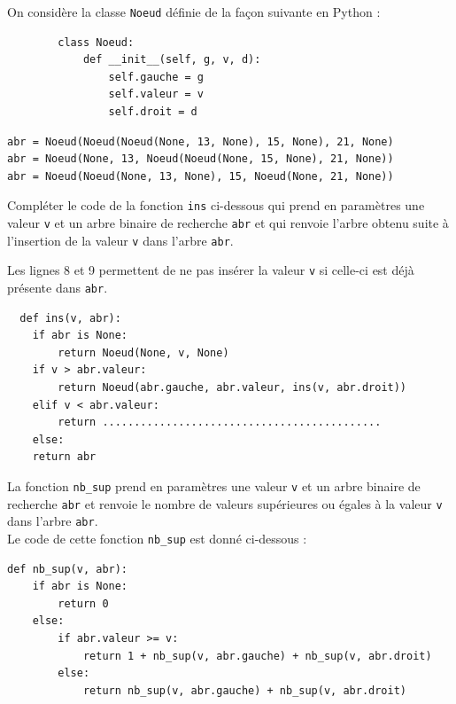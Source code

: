 \documentclass[a4paper,12pt,article,firamath]{nsi}
\begin{document}
On considère la classe \texttt{Noeud} définie de la façon suivante en Python :


\begin{verbatim}
        class Noeud:
            def __init__(self, g, v, d):
                self.gauche = g
                self.valeur = v
                self.droit = d
\end{verbatim}



\begin{verbatim}
abr = Noeud(Noeud(Noeud(None, 13, None), 15, None), 21, None)
abr = Noeud(None, 13, Noeud(Noeud(None, 15, None), 21, None))
abr = Noeud(Noeud(None, 13, None), 15, Noeud(None, 21, None)) 
\end{verbatim}

\question Compléter le code de la fonction \texttt{ins} ci-dessous qui
prend en paramètres une valeur \texttt{v} et un arbre binaire de recherche \texttt{abr} et qui
renvoie l'arbre obtenu suite à l'insertion de la valeur \texttt{v} dans l'arbre \texttt{abr}.

Les lignes 8 et 9 permettent de ne pas insérer la valeur \texttt{v} si celle-ci est déjà présente dans \texttt{abr}.


\begin{verbatim}
  def ins(v, abr):
    if abr is None:
        return Noeud(None, v, None)
    if v > abr.valeur:
        return Noeud(abr.gauche, abr.valeur, ins(v, abr.droit))
    elif v < abr.valeur:
        return ............................................
    else:
    return abr      
\end{verbatim}

La fonction \texttt{nb_sup} prend en paramètres une valeur \texttt{v} et un arbre binaire de recherche \texttt{abr} et renvoie le nombre de valeurs supérieures ou égales à la valeur \texttt{v} dans l'arbre \texttt{abr}.\\

Le code de cette fonction \texttt{nb_sup} est donné ci-dessous :

\begin{verbatim}
def nb_sup(v, abr):
    if abr is None:
        return 0
    else:
        if abr.valeur >= v:
            return 1 + nb_sup(v, abr.gauche) + nb_sup(v, abr.droit)
        else:
            return nb_sup(v, abr.gauche) + nb_sup(v, abr.droit)
\end{verbatim}
\end{document}
